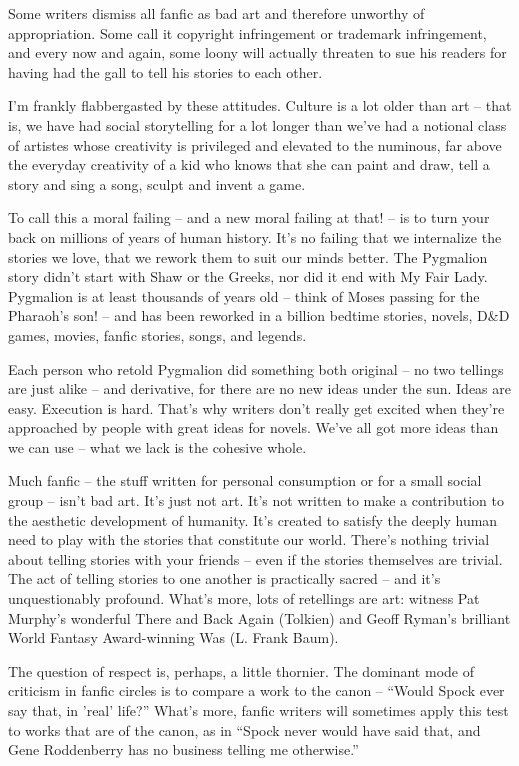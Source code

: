 Some writers dismiss all fanfic as bad art and therefore unworthy
of appropriation. Some call it copyright infringement or trademark
infringement, and every now and again, some loony will actually
threaten to sue his readers for having had the gall to tell his
stories to each other.

I'm frankly flabbergasted by these attitudes. Culture is a lot
older than art -- that is, we have had social storytelling for a
lot longer than we've had a notional class of artistes whose
creativity is privileged and elevated to the numinous, far above
the everyday creativity of a kid who knows that she can paint and
draw, tell a story and sing a song, sculpt and invent a game.

To call this a moral failing -- and a new moral failing at that! --
is to turn your back on millions of years of human history. It's no
failing that we internalize the stories we love, that we rework
them to suit our minds better. The Pygmalion story didn't start
with Shaw or the Greeks, nor did it end with My Fair Lady.
Pygmalion is at least thousands of years old -- think of Moses
passing for the Pharaoh's son! -- and has been reworked in a
billion bedtime stories, novels, D\&D games, movies, fanfic
stories, songs, and legends.

Each person who retold Pygmalion did something both original -- no
two tellings are just alike -- and derivative, for there are no new
ideas under the sun. Ideas are easy. Execution is hard. That's why
writers don't really get excited when they're approached by people
with great ideas for novels. We've all got more ideas than we can
use -- what we lack is the cohesive whole.

Much fanfic -- the stuff written for personal consumption or for a
small social group -- isn't bad art. It's just not art. It's not
written to make a contribution to the aesthetic development of
humanity. It's created to satisfy the deeply human need to play
with the stories that constitute our world. There's nothing trivial
about telling stories with your friends -- even if the stories
themselves are trivial. The act of telling stories to one another
is practically sacred -- and it's unquestionably profound. What's
more, lots of retellings are art: witness Pat Murphy's wonderful
There and Back Again (Tolkien) and Geoff Ryman's brilliant World
Fantasy Award-winning Was (L. Frank Baum).

The question of respect is, perhaps, a little thornier. The
dominant mode of criticism in fanfic circles is to compare a work
to the canon -- ``Would Spock ever say that, in 'real' life?'' What's
more, fanfic writers will sometimes apply this test to works that
are of the canon, as in ``Spock never would have said that, and Gene
Roddenberry has no business telling me otherwise.''

